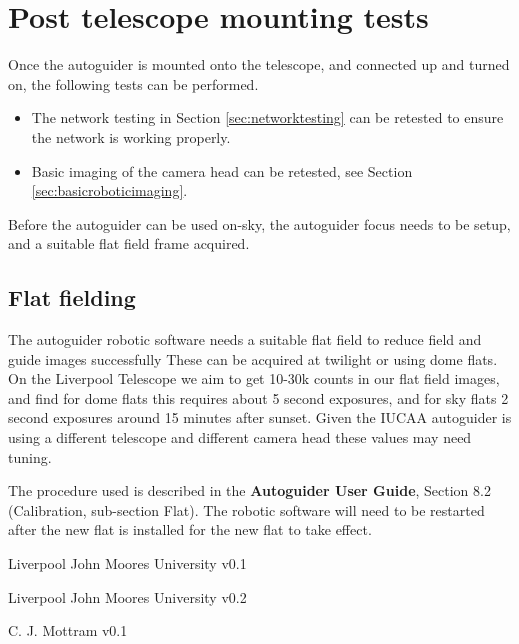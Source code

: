 \documentclass[10pt,a4paper]{article}
\begin{document}
\section{Post telescope mounting tests}

Once the autoguider is mounted onto the telescope, and connected up and turned on, the following tests can be performed.
\begin{itemize}
\item The network testing in Section \ref{sec:networktesting} can be retested to ensure the network is working properly.\item Basic imaging of the camera head can be retested, see Section \ref{sec:basicroboticimaging}.
\end{itemize}

Before the autoguider can be used on-sky, the autoguider focus needs to be setup, and a suitable flat field frame acquired.

\subsection{Flat fielding}

The autoguider robotic software needs a suitable flat field to reduce field and guide images successfully These can be acquired at twilight or using dome flats. On the Liverpool Telescope we aim to get 10-30k counts in our flat field images, and find for dome flats this requires about 5 second exposures, and for sky flats 2 second exposures around 15 minutes after sunset. Given the IUCAA autoguider is using a different telescope and different camera head these values may need tuning.

The procedure used is described in the {\bf Autoguider User Guide}, Section 8.2 (Calibration, sub-section Flat). The robotic software will need to be restarted after the new flat is installed for the new flat to take effect.

\begin{thebibliography}{99}

Liverpool John Moores University   v0.1

Liverpool John Moores University   v0.2

C. J. Mottram   v0.1

\end{thebibliography}
\end{document}

